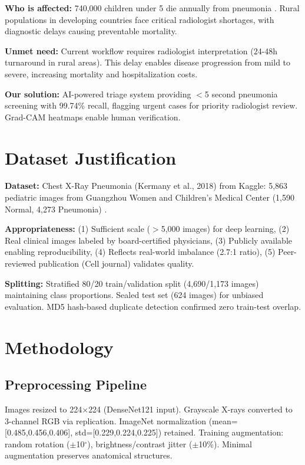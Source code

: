 \documentclass[12pt,a4paper]{article}
\begin{document}
\textbf{Who is affected:} 740,000 children under 5 die annually from pneumonia \cite{who2023}. Rural populations in developing countries face critical radiologist shortages, with diagnostic delays causing preventable mortality.

\textbf{Unmet need:} Current workflow requires radiologist interpretation (24-48h turnaround in rural areas). This delay enables disease progression from mild to severe, increasing mortality and hospitalization costs.

\textbf{Our solution:} AI-powered triage system providing $<$5 second pneumonia screening with 99.74\% recall, flagging urgent cases for priority radiologist review. Grad-CAM heatmaps enable human verification.

\section{Dataset Justification}

\textbf{Dataset:} Chest X-Ray Pneumonia (Kermany et al., 2018) from Kaggle: 5,863 pediatric images from Guangzhou Women and Children's Medical Center (1,590 Normal, 4,273 Pneumonia) \cite{kermany2018}.

\textbf{Appropriateness:} (1) Sufficient scale ($>$5,000 images) for deep learning, (2) Real clinical images labeled by board-certified physicians, (3) Publicly available enabling reproducibility, (4) Reflects real-world imbalance (2.7:1 ratio), (5) Peer-reviewed publication (Cell journal) validates quality.

\textbf{Splitting:} Stratified 80/20 train/validation split (4,690/1,173 images) maintaining class proportions. Sealed test set (624 images) for unbiased evaluation. MD5 hash-based duplicate detection confirmed zero train-test overlap.

\section{Methodology}

\subsection{Preprocessing Pipeline}
Images resized to 224$\times$224 (DenseNet121 input). Grayscale X-rays converted to 3-channel RGB via replication. ImageNet normalization (mean=[0.485,0.456,0.406], std=[0.229,0.224,0.225]) retained. Training augmentation: random rotation ($\pm$10$^\circ$), brightness/contrast jitter ($\pm$10\%). Minimal augmentation preserves anatomical structures.
\end{document}
